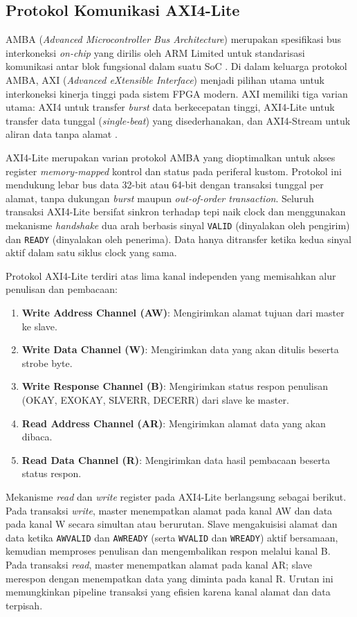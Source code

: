 \subsection{Protokol Komunikasi AXI4-Lite}

AMBA (\textit{Advanced Microcontroller Bus Architecture}) merupakan spesifikasi bus interkoneksi \textit{on-chip} yang dirilis oleh ARM Limited untuk standarisasi komunikasi antar blok fungsional dalam suatu SoC \citep{arm_amba_axi_2010}. Di dalam keluarga protokol AMBA, AXI (\textit{Advanced eXtensible Interface}) menjadi pilihan utama untuk interkoneksi kinerja tinggi pada sistem FPGA modern. AXI memiliki tiga varian utama: AXI4 untuk transfer \textit{burst} data berkecepatan tinggi, AXI4-Lite untuk transfer data tunggal (\textit{single-beat}) yang disederhanakan, dan AXI4-Stream untuk aliran data tanpa alamat \citep{xilinx_axi_ref_2017}.

AXI4-Lite merupakan varian protokol AMBA yang dioptimalkan untuk akses register \textit{memory-mapped} kontrol dan status pada periferal kustom. Protokol ini mendukung lebar bus data 32-bit atau 64-bit dengan transaksi tunggal per alamat, tanpa dukungan \textit{burst} maupun \textit{out-of-order transaction}. Seluruh transaksi AXI4-Lite bersifat sinkron terhadap tepi naik clock dan menggunakan mekanisme \textit{handshake} dua arah berbasis sinyal \texttt{VALID} (dinyalakan oleh pengirim) dan \texttt{READY} (dinyalakan oleh penerima). Data hanya ditransfer ketika kedua sinyal aktif dalam satu siklus clock yang sama.

Protokol AXI4-Lite terdiri atas lima kanal independen yang memisahkan alur penulisan dan pembacaan:
\begin{enumerate}
    \item \textbf{Write Address Channel (AW)}: Mengirimkan alamat tujuan dari master ke slave.
    \item \textbf{Write Data Channel (W)}: Mengirimkan data yang akan ditulis beserta strobe byte.
    \item \textbf{Write Response Channel (B)}: Mengirimkan status respon penulisan (OKAY, EXOKAY, SLVERR, DECERR) dari slave ke master.
    \item \textbf{Read Address Channel (AR)}: Mengirimkan alamat data yang akan dibaca.
    \item \textbf{Read Data Channel (R)}: Mengirimkan data hasil pembacaan beserta status respon.
\end{enumerate}

Mekanisme \textit{read} dan \textit{write} register pada AXI4-Lite berlangsung sebagai berikut. Pada transaksi \textit{write}, master menempatkan alamat pada kanal AW dan data pada kanal W secara simultan atau berurutan. Slave mengakuisisi alamat dan data ketika \texttt{AWVALID} dan \texttt{AWREADY} (serta \texttt{WVALID} dan \texttt{WREADY}) aktif bersamaan, kemudian memproses penulisan dan mengembalikan respon melalui kanal B. Pada transaksi \textit{read}, master menempatkan alamat pada kanal AR; slave merespon dengan menempatkan data yang diminta pada kanal R. Urutan ini memungkinkan pipeline transaksi yang efisien karena kanal alamat dan data terpisah.

